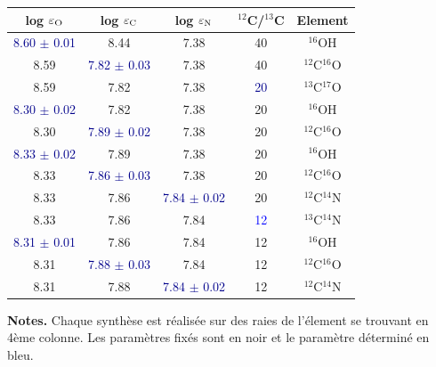\documentclass{article}
\begin{document}
\begin{table}[h!]
  \vspace{0.3cm}
\begin{center}
	\begin{tabular}{ccccc}
        \hline
		\hline
        log $\varepsilon_{\rm O}$ & log $\varepsilon_{\rm C}$ & log $\varepsilon_{\rm N}$ & $^{12}$C/$^{13}$C & Element\\
        \hline
    \textcolor{darkblue}{8.60 $\pm$ 0.01} & 8.44 & 7.38 & 40 & $^{16}$OH \\
    8.59 & \textcolor{darkblue}{7.82 $\pm$ 0.03} & 7.38 & 40 & $^{12}$C$^{16}$O \\
    8.59 & 7.82 & 7.38 & \textcolor{darkblue}{20} & $^{13}$C$^{17}$O \\
    \textcolor{darkblue}{8.30 $\pm$ 0.02} & 7.82 & 7.38 & 20 & $^{16}$OH \\
    8.30 & \textcolor{darkblue}{7.89 $\pm$ 0.02} & 7.38 & 20 & $^{12}$C$^{16}$O \\
    \textcolor{darkblue}{8.33 $\pm$ 0.02} & 7.89 & 7.38 & 20 & $^{16}$OH \\
    8.33 & \textcolor{darkblue}{7.86 $\pm$ 0.03} & 7.38 & 20 & $^{12}$C$^{16}$O \\
    8.33 & 7.86 & \textcolor{darkblue}{7.84 $\pm$ 0.02} & 20 & $^{12}$C$^{14}$N \\
    8.33 & 7.86 & 7.84 & \textcolor{blue}{12} & $^{13}$C$^{14}$N \\
    \textcolor{darkblue}{8.31 $\pm$ 0.01} & 7.86 & 7.84 & 12 & $^{16}$OH \\
    8.31 & \textcolor{darkblue}{7.88 $\pm$ 0.03} & 7.84 & 12 & $^{12}$C$^{16}$O \\
    8.31 & 7.88 & \textcolor{darkblue}{7.84 $\pm$ 0.02} & 12 & $^{12}$C$^{14}$N \\
    \end{tabular}
\end{center} 
\textbf{Notes.} 
Chaque synthèse est réalisée sur des raies de l'élement se trouvant en 4ème colonne. 
Les paramètres fixés sont en noir et le paramètre déterminé en bleu. 
\label{itération_CNO}
\end{table}
\end{document}
